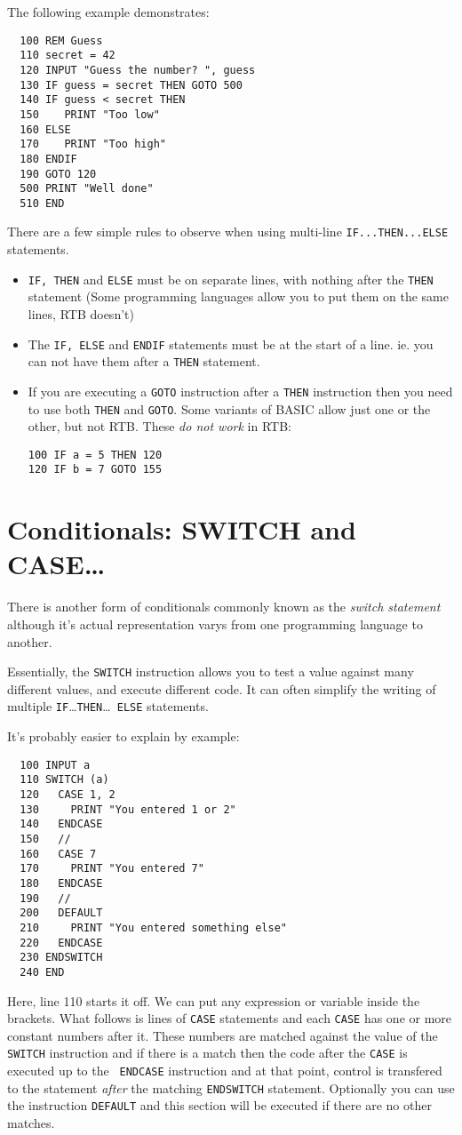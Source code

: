The following example demonstrates:
\begin{verbatim}
  100 REM Guess
  110 secret = 42
  120 INPUT "Guess the number? ", guess
  130 IF guess = secret THEN GOTO 500
  140 IF guess < secret THEN
  150    PRINT "Too low"
  160 ELSE
  170    PRINT "Too high"
  180 ENDIF
  190 GOTO 120
  500 PRINT "Well done"
  510 END
\end{verbatim}
There are a few simple rules to observe when using multi-line
{\tt IF...THEN...ELSE} statements.
\begin{itemize}
\item {\tt IF, THEN} and {\tt ELSE} must be on separate lines, with
nothing after the {\tt THEN} statement (Some programming languages allow
you to put them on the same lines, RTB doesn't)
\item The {\tt IF, ELSE} and {\tt ENDIF} statements must be at the start
of a line. ie. you can not have them after a {\tt THEN} statement.
\item If you are executing a {\tt GOTO} instruction after a {\tt THEN}
instruction then you need to use both {\tt THEN} and {\tt GOTO}. Some
variants of BASIC allow just one or the other, but not RTB. These {\em
do not work} in RTB:
\begin{verbatim}
100 IF a = 5 THEN 120
120 IF b = 7 GOTO 155
\end{verbatim}
\end{itemize}

\chapter{Conditionals: SWITCH and CASE\dots}
There is another form of conditionals commonly known as the {\em
switch statement} although it's actual representation varys from one
programming language to another.

Essentially, the {\tt SWITCH} instruction allows you to test a value
against many different values, and execute different code. It can often
simplify the writing of multiple {\tt IF}\dots {\tt THEN}\dots {\tt
ELSE} statements.

It's probably easier to explain by example:
\begin{verbatim}
  100 INPUT a
  110 SWITCH (a)
  120   CASE 1, 2
  130     PRINT "You entered 1 or 2"
  140   ENDCASE 
  150   //
  160   CASE 7
  170     PRINT "You entered 7"
  180   ENDCASE 
  190   //
  200   DEFAULT 
  210     PRINT "You entered something else"
  220   ENDCASE 
  230 ENDSWITCH 
  240 END 
\end{verbatim}
Here, line 110 starts it off. We can put any expression or variable inside
the brackets. What follows is lines of {\tt CASE} statements and each
{\tt CASE} has one or more constant numbers after it. These numbers are
matched against the value of the {\tt SWITCH} instruction and if there is
a match then the code after the {\tt CASE} is executed up to the {\tt
ENDCASE} instruction and at that point, control is transfered to the
statement {\em after} the matching {\tt ENDSWITCH} statement. Optionally
you can use the instruction {\tt DEFAULT} and this section will be executed
if there are no other matches.

